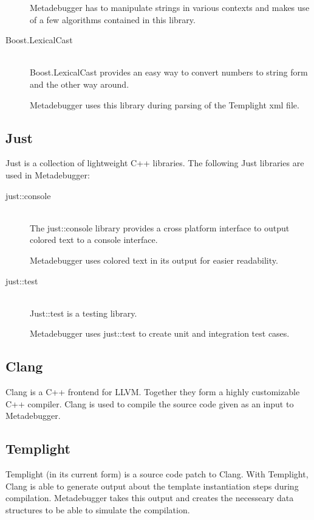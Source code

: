 \begin{description}
        Metadebugger has to manipulate strings in various contexts and makes
        use of a few algorithms contained in this library.
    \item[Boost.LexicalCast] \hfill \\
        Boost.LexicalCast provides an easy way to convert numbers to string
        form and the other way around.

        Metadebugger uses this library during parsing of the Templight xml
        file.

\end{description}

\subsection*{Just\cite{just}}

Just is a collection of lightweight C++ libraries. The following Just libraries
are used in Metadebugger:
\begin{description}
    \item[just::console] \hfill \\
        The just::console library provides a cross platform interface to output
        colored text to a console interface.

        Metadebugger uses colored text in its output for easier readability.
    \item[just::test] \hfill \\
        Just::test is a testing library.

        Metadebugger uses just::test to create unit and integration test cases.
\end{description}

\subsection*{Clang\cite{clang}}

Clang is a C++ frontend for LLVM. Together they form a highly customizable C++
compiler. Clang is used to compile the source code given as an input to
Metadebugger.

\subsection*{Templight\cite{templight}}

Templight (in its current form) is a source code patch to Clang. With
Templight, Clang is able to generate output about the template instantiation
steps during compilation. Metadebugger takes this output and creates the
necesseary data structures to be able to simulate the compilation.

